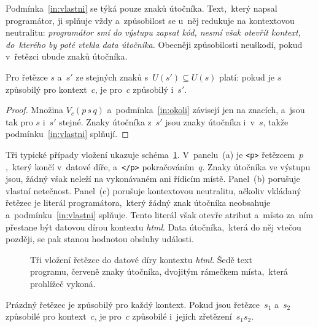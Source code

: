 Podmínka~\eqref{in:vlastni} se týká pouze znaků útočníka. Text,~který napsal programátor, ji splňuje vždy a~způsobilost se u~něj redukuje na kontextovou neutralitu: \emph{programátor smí do výstupu zapsat kód, nesmí však otevřít kontext, do~kterého by poté vtekla data útočníka.} Obecněji způsobilosti neuškodí, pokud v~řetězci ubude znaků útočníka.

\begin{tvrzeni}
\label{lem:monotonie}
Pro řetězce $s$ a~$s'$ ze stejných znaků s~$U(s') \subseteq U(s)$ platí: pokud je $s$ způsobilý pro kontext~$c$, je pro~$c$ způsobilý i~$s'$.
\end{tvrzeni}

\begin{proof}
Množina $V_c(p\,s\,q)$ a~podmínka~\eqref{in:okoli} závisejí jen na znacích, a~jsou tak pro $s$ i~$s'$ stejné. Znaky útočníka z~$s'$ jsou znaky útočníka i~v~$s$, takže podmínku~\eqref{in:vlastni} splňují.
\end{proof}

Tři typické případy vložení ukazuje schéma~\ref{fig:inertnost}. V~panelu~(a) je \texttt{<p>} řetězcem~$p$,~který končí v~datové díře, a~\texttt{</p>} pokračováním~$q$. Znaky útočníka ve výstupu jsou, žádný však neleží na vykonávaném ani řídicím místě. Panel~(b) porušuje vlastní netečnost. Panel~(c) porušuje kontextovou neutralitu, ačkoliv vkládaný řetězec je literál programátora,~který žádný znak útočníka neobsahuje a~podmínku~\eqref{in:vlastni} splňuje. Tento literál však otevře atribut a~místo za~ním přestane být datovou dírou kontextu \emph{html}. Data útočníka,~která do něj vtečou později, se pak stanou hodnotou obsluhy události.

\begin{figure}[htbp]
    \centering
    \caption[Tři vložení řetězce do datové díry kontextu \emph{html}]{Tři vložení řetězce do datové díry kontextu \emph{html}. Šedě text programu, červeně znaky útočníka, dvojitým rámečkem místa,~která prohlížeč vykoná.}
    \label{fig:inertnost}
\end{figure}

\begin{tvrzeni}
\label{lem:monoid}
Prázdný řetězec je způsobilý pro každý kontext. Pokud jsou řetězce~$s_1$ a~$s_2$ způsobilé pro kontext~$c$, je pro~$c$ způsobilé i~jejich zřetězení~$s_1 s_2$.
\end{tvrzeni}

